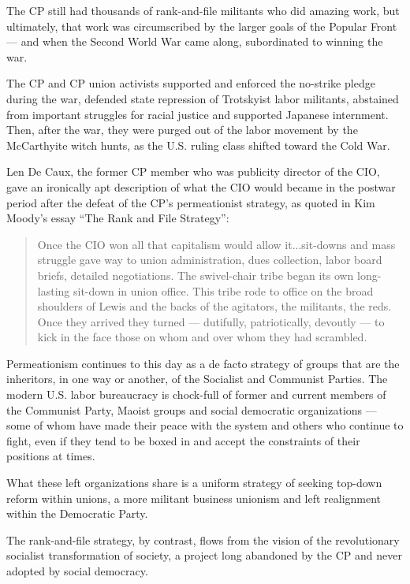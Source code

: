 The CP still had thousands of rank-and-file militants who did amazing work, but ultimately, that work was circumscribed by the larger goals of the Popular Front — and when the Second World War came along, subordinated to winning the war.

The CP and CP union activists supported and enforced the no-strike pledge during the war, defended state repression of Trotskyist labor militants, abstained from important struggles for racial justice and supported Japanese internment. Then, after the war, they were purged out of the labor movement by the McCarthyite witch hunts, as the U.S. ruling class shifted toward the Cold War.

Len De Caux, the former CP member who was publicity director of the CIO, gave an ironically apt description of what the CIO would became in the postwar period after the defeat of the CP’s permeationist strategy, as quoted in Kim Moody’s essay “The Rank and File Strategy”:

\blockquote{
Once the CIO won all that capitalism would allow it...sit-downs and mass struggle gave way to union administration, dues collection, labor board briefs, detailed negotiations. The swivel-chair tribe began its own long-lasting sit-down in union office. This tribe rode to office on the broad shoulders of Lewis and the backs of the agitators, the militants, the reds. Once they arrived they turned — dutifully, patriotically, devoutly — to kick in the face those on whom and over whom they had scrambled. 
}

Permeationism continues to this day as a de facto strategy of groups that are the inheritors, in one way or another, of the Socialist and Communist Parties. The modern U.S. labor bureaucracy is chock-full of former and current members of the Communist Party, Maoist groups and social democratic organizations — some of whom have made their peace with the system and others who continue to fight, even if they tend to be boxed in and accept the constraints of their positions at times.

What these left organizations share is a uniform strategy of seeking top-down reform within unions, a more militant business unionism and left realignment within the Democratic Party.

\sectiondivider

The rank-and-file strategy, by contrast, flows from the vision of the revolutionary socialist transformation of society, a project long abandoned by the CP and never adopted by social democracy.

